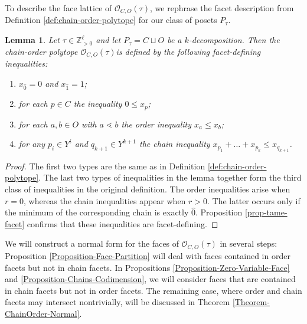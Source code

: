 \documentclass[12pt,a4paper]{amsart}
\renewcommand{\prec}{\lessdot}
\newtheorem{lemma}[theorem]{Lemma}
\theoremstyle{definition}
\newcommand{\OP}{\mathcal{O}}
\newcommand{\Z}{\mathbb{Z}}
\begin{document}
To describe the face lattice of $\OP_{C,O}(\tau)$, we rephrase the facet description from Definition \ref{def:chain-order-polytope} for our class of posets $P_\tau$.
\begin{lemma}\label{Lemma-Chain-Order-Facet-Alternate}
    Let $\tau\in\Z_{> 0}^\ell$ and let $P_\tau=C\sqcup O$ be a $k$-decomposition. 
    Then the chain-order polytope $\OP_{C,O}(\tau)$is defined by the following facet-defining inequalities:
    \begin{enumerate}
        \item{$x_{\hat{0}}=0$ and $x_{\hat{1}}=1$};
        \item{for each $p \in  C$ the inequality $0\leq x_p$};
        \item{for each $a,b\in O$ with $a\prec b$ the \emph{order inequality} $x_a\leq x_b$};
        \item{for any $p_i\in Y^{i}$ and $q_{k+1}\in Y^{k+1}$ the \emph{chain inequality} $x_{p_{1}} +\dots +x_{p_{k}} \leq x_{q_{k+1}}$\enspace .}
    \end{enumerate}
\end{lemma}
\begin{proof}
    The first two types are the same as in Definition \ref{def:chain-order-polytope}.
    The last two types of inequalities in the lemma together form the third class of inequalities in the original definition.
    The order inequalities arise when $r=0$, whereas the chain inequalities appear when $r>0$. The latter occurs only if the minimum of the corresponding chain is exactly $\hat{0}$.
    Proposition \ref{prop-tame-facet} confirms that these inequalities are facet-defining.
\end{proof}

We will construct a normal form for the faces of $\OP_{C,O}(\tau)$ in several steps:
Proposition \ref{Proposition-Face-Partition} will deal with faces contained in order facets but not in chain facets.
In Propositions \ref{Proposition-Zero-Variable-Face} and \ref{Proposition-Chains-Codimension}, we will consider faces that are contained in chain facets but not in order facets.
The remaining case, where order and chain facets may intersect nontrivially, will be discussed in Theorem \ref{Theorem-ChainOrder-Normal}.
\end{document}
